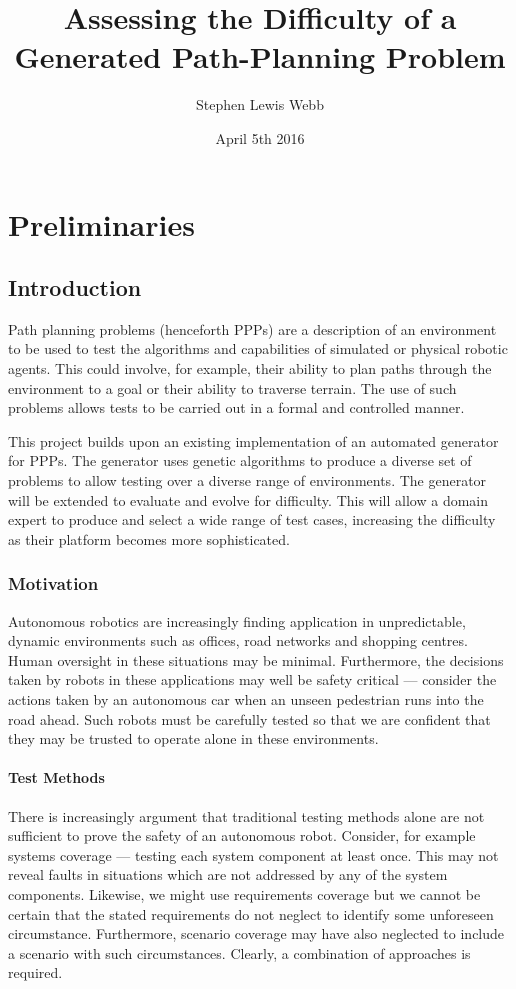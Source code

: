 \documentclass[authoryearcitations]{UoYCSproject}
\author{Stephen Lewis Webb}
\title{Assessing the Difficulty of a Generated Path-Planning Problem}
\date{April 5th 2016}
\begin{document}
\maketitle
\listoffigures
\listoftables


\part{Preliminaries}
\label{sec:start}
\chapter{Introduction}
\label{cha:Introduction}
Path planning problems (henceforth PPPs) are a description of an environment to be used to test the algorithms and capabilities of simulated or physical robotic agents. This could involve, for example, their ability to plan paths through the environment to a goal or their ability to traverse terrain. The use of such problems allows tests to be carried out in a formal and controlled manner.

This project builds upon an existing implementation of an automated generator for PPPs. The generator uses genetic algorithms to produce a diverse set of problems to allow testing over a diverse range of environments. The generator will be extended to evaluate and evolve for difficulty. This will allow a domain expert to produce and select a wide range of test cases, increasing the difficulty as their platform becomes more sophisticated.

\section{Motivation}
\label{sec:Motivation}
Autonomous robotics are increasingly finding application in unpredictable, dynamic environments such as offices, road networks and shopping centres. Human oversight in these situations may be minimal. Furthermore, the decisions taken by robots in these applications may well be safety critical --- consider the actions taken by an autonomous car when an unseen pedestrian runs into the road ahead. Such robots must be carefully tested so that we are confident that they may be trusted to operate alone in these environments.
\subsection{Test Methods}
\label{sec:test_methods}
There is increasingly argument that traditional testing methods alone are not sufficient to prove the safety of an autonomous robot. Consider, for example systems coverage --- testing each system component at least once. This may not reveal faults in situations which are not addressed by any of the system components. Likewise, we might use requirements coverage but we cannot be certain that the stated requirements do not neglect to identify some unforeseen circumstance. Furthermore, scenario coverage may have also neglected to include a scenario with such circumstances. Clearly, a combination of approaches is required.
\end{document}
